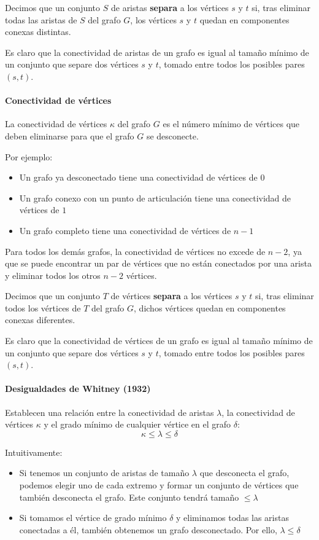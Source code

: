 \documentclass[a4paper]{article}
\begin{document}
Decimos que un conjunto \(S\) de aristas \textbf{separa} a los vértices \(s\) y \(t\) si, tras eliminar todas las aristas de \(S\) del grafo \(G\), los vértices \(s\) y \(t\) quedan en componentes conexas distintas.

Es claro que la conectividad de aristas de un grafo es igual al tamaño mínimo de un conjunto que separe dos vértices \(s\) y \(t\), tomado entre todos los posibles pares \((s, t)\).

\paragraph{Conectividad de vértices}
La conectividad de vértices \(\kappa\) del grafo \(G\) es el número mínimo de vértices que deben eliminarse para que el grafo \(G\) se desconecte.

Por ejemplo:
\begin{itemize}
    \item Un grafo ya desconectado tiene una conectividad de vértices de \(0\)
    \item Un grafo conexo con un punto de articulación tiene una conectividad de vértices de \(1\)
    \item Un grafo completo tiene una conectividad de vértices de \(n-1\)
\end{itemize}

Para todos los demás grafos, la conectividad de vértices no excede de \(n-2\), ya que se puede encontrar un par de vértices que no están conectados por una arista y eliminar todos los otros \(n-2\) vértices.

Decimos que un conjunto \(T\) de vértices \textbf{separa} a los vértices \(s\) y \(t\) si, tras eliminar todos los vértices de \(T\) del grafo \(G\), dichos vértices quedan en componentes conexas diferentes.

Es claro que la conectividad de vértices de un grafo es igual al tamaño mínimo de un conjunto que separe dos vértices \(s\) y \(t\), tomado entre todos los posibles pares \((s, t)\).

\paragraph{Desigualdades de Whitney (1932)}
Establecen una relación entre la conectividad de aristas \(\lambda\), la conectividad de vértices \(\kappa\) y el grado mínimo de cualquier vértice en el grafo \(\delta\):
\[
\kappa \leq \lambda \leq \delta
\]

Intuitivamente:
\begin{itemize}
    \item Si tenemos un conjunto de aristas de tamaño \(\lambda\) que desconecta el grafo, podemos elegir uno de cada extremo y formar un conjunto de vértices que también desconecta el grafo. Este conjunto tendrá tamaño \(\leq \lambda\)
    \item Si tomamos el vértice de grado mínimo \(\delta\) y eliminamos todas las aristas conectadas a él, también obtenemos un grafo desconectado. Por ello, \(\lambda \leq \delta\)
\end{itemize}
\end{document}
